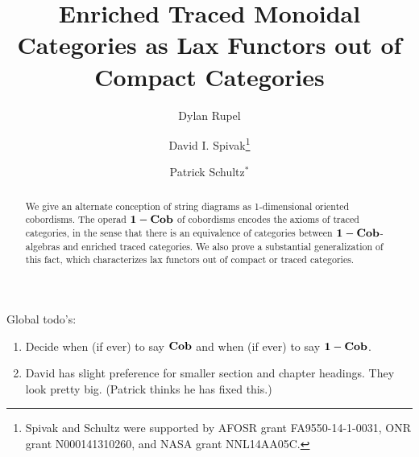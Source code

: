 \documentclass[12pt,oneside,article,draft]{memoir}
\title{Enriched Traced Monoidal Categories as Lax Functors out of Compact Categories}
\author{
Dylan Rupel 
 \and 
David I. Spivak\thanks{Spivak and Schultz were supported by AFOSR grant FA9550-14-1-0031, ONR grant N000141310260, and NASA grant NNL14AA05C.}
 \and 
 Patrick Schultz${}^*$%
 }
\begin{document}
\tightlists
\firmlists

\maketitle
\begin{abstract}
We give an alternate conception of string diagrams as 1-dimensional oriented cobordisms. The operad $\mathbf{1-Cob}$ of cobordisms encodes the axioms of traced categories, in the sense that there is an equivalence of categories between $\mathbf{1-Cob}$-algebras and enriched traced categories. We also prove a substantial generalization of this fact, which characterizes lax functors out of compact or traced categories.
\end{abstract}
Global todo's:
\begin{enumerate}
\item Decide when (if ever) to say $\mathbf{Cob}$ and when (if ever) to say $\mathbf{1-Cob}$.
\item David has slight preference for smaller section and chapter headings. They look pretty big. (Patrick thinks he has fixed this.)
\end{enumerate}
\tableofcontents*


\end{document}
